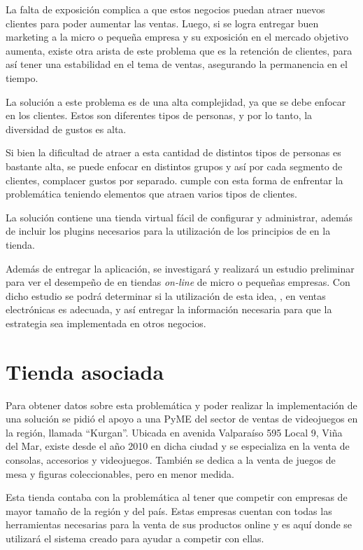 La falta de exposición complica a que estos negocios puedan atraer nuevos clientes
para poder aumentar las ventas.
Luego, si se logra entregar buen marketing a la micro o pequeña empresa y su
exposición en el mercado objetivo aumenta, existe otra arista de este problema
que es la retención de clientes, para así tener una estabilidad en el tema
de ventas, asegurando la permanencia en el tiempo.

La solución a este problema es de una alta complejidad, ya que se debe enfocar en
los clientes.
Estos son diferentes tipos de personas, y por lo tanto, la diversidad de gustos es
alta.

Si bien la dificultad de atraer a esta cantidad de distintos tipos de personas
es bastante alta, se puede enfocar en distintos grupos y así por cada segmento
de clientes, complacer gustos por separado.
{\GAM} cumple con esta forma de enfrentar la problemática teniendo elementos que
atraen varios tipos de clientes.

La solución contiene una tienda virtual fácil de configurar y administrar,
además de incluir los plugins necesarios para la utilización de los principios
de {\gam} en la tienda.

Además de entregar la aplicación, se investigará y realizará un estudio preliminar
para ver el desempeño de {\gam} en tiendas \emph{on-line} de micro o pequeñas empresas.
Con dicho estudio se podrá determinar si la utilización de esta idea, {\gam}, en ventas
electrónicas es adecuada,
y así entregar la información necesaria para que la estrategia sea implementada
en otros negocios.

\section{Tienda asociada}

Para obtener datos sobre esta problemática y poder realizar la implementación de una
solución se pidió el apoyo a una PyME del sector de ventas de videojuegos en la región,
llamada ``Kurgan''. Ubicada en avenida Valparaíso 595 Local 9, Viña del Mar, existe desde
el año 2010 en dicha ciudad y se especializa en la venta de consolas, accesorios y videojuegos.
También se dedica a la venta de juegos de mesa y figuras coleccionables, pero en menor medida.

Esta tienda contaba con la problemática al tener que competir con empresas de mayor 
tamaño de la región y del país. Estas empresas cuentan con todas las herramientas
necesarias para la venta de sus productos online y es aquí donde se utilizará 
el sistema creado para ayudar a competir con ellas. 

